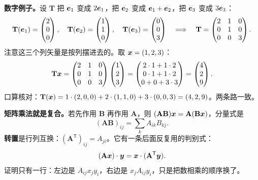 \documentclass[11pt]{ctexart}
\newcommand{\ten}[1]{\mathbf{#1}}
\let\origsubhdr\subhdr
\renewcommand{\subhdr}[1]{\par\needspace{3\baselineskip}\origsubhdr{#1}}
\begin{document}
\textbf{数字例子。}设 $\ten T$ 把 $\boldsymbol{e}_1$ 变成 $2\boldsymbol{e}_1$，把 $\boldsymbol{e}_2$ 变成 $\boldsymbol{e}_1+\boldsymbol{e}_2$，把 $\boldsymbol{e}_3$ 变成 $3\boldsymbol{e}_3$：
\[
\ten T(\vect e_1)=\begin{pmatrix}2\\0\\0\end{pmatrix},\quad
\ten T(\vect e_2)=\begin{pmatrix}1\\1\\0\end{pmatrix},\quad
\ten T(\vect e_3)=\begin{pmatrix}0\\0\\3\end{pmatrix}
\quad\Longrightarrow\quad
\ten T=\begin{pmatrix}2&1&0\\0&1&0\\0&0&3\end{pmatrix}.
\]
注意这三个列矢量是按列摆进去的。取 $\boldsymbol{x}=(1,2,3)$：
\[
\ten T\vect x=\begin{pmatrix}2&1&0\\0&1&0\\0&0&3\end{pmatrix}\begin{pmatrix}1\\2\\3\end{pmatrix}
=\begin{pmatrix}2\cdot1+1\cdot2\\0\cdot1+1\cdot2\\0+0+3\cdot3\end{pmatrix}=\begin{pmatrix}4\\2\\9\end{pmatrix}.
\]
口算核对：$\ten T(\vect x)=1\cdot(2,0,0)+2\cdot(1,1,0)+3\cdot(0,0,3)=(4,2,9)$。两条路一致。

\textbf{矩阵乘法就是复合。}若先作用 $\ten B$ 再作用 $\ten A$，则 $(\ten A\ten B)\vect x=\ten A(\ten B\vect x)$，分量式是
\[
(\ten A\ten B)_{ij}=\sum_k A_{ik}B_{kj}.
\]
\textbf{转置}是行列互换：$(\ten A^{\mathsf T})_{ij}=A_{ji}$。它有一条后面反复用的判别式：
\[
(\ten A\vect x)\cdot\vect y=\vect x\cdot(\ten A^{\mathsf T}\vect y).
\]
证明只有一行：左边是 $A_{ij}x_jy_i$，右边是 $x_jA_{ij}y_i$，只是把数相乘的顺序换了。

\end{document}

